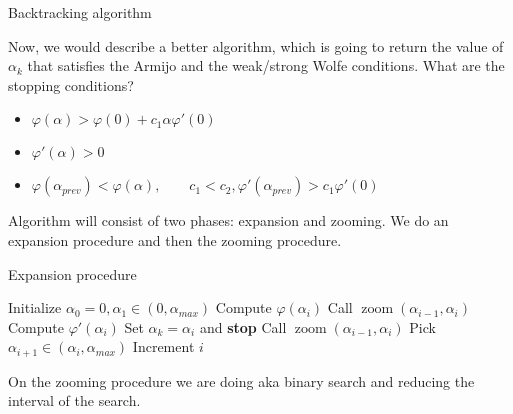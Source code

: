 \begin{algorithm}
  \caption{Backtracking algorithm}
  \begin{algorithmic}[1]
      \State{$\alpha \gets \beta \alpha$}
  \EndWhile{}
\end{algorithmic}
\end{algorithm}

Now, we would describe a better algorithm, which is going to return the value of $\alpha_k$ that satisfies the Armijo and the weak/strong Wolfe conditions. What are the stopping conditions? 

\begin{itemize}
  \item $\varphi(\alpha) > \varphi(0) + c_1 \alpha \varphi'(0)$ 
  \item $\varphi'(\alpha) > 0$
  \item $\varphi(\alpha_{prev}) < \varphi(\alpha), \qquad c_1 < c_2, \varphi'(\alpha_{prev}) > c_1 \varphi'(0)$
\end{itemize}

Algorithm will consist of two phases: expansion and zooming. We do an expansion procedure and then the zooming procedure.

\begin{algorithm}[H]
  \caption{Expansion procedure}
  \begin{algorithmic}[1]
  \State Initialize $\alpha_0 = 0, \alpha_1 \in (0, \alpha_{max})$
      \State Compute $\varphi(\alpha_i)$
          \State Call $\operatorname{zoom}(\alpha_{i-1}, \alpha_i)$
      \EndIf
      \State Compute $\varphi'(\alpha_i)$
          \State Set $\alpha_k = \alpha_i$ and \textbf{stop}
      \EndIf
          \State Call $\operatorname{zoom}(\alpha_{i-1}, \alpha_i)$
      \EndIf
      \State Pick $\alpha_{i+1} \in (\alpha_i, \alpha_{max})$
      \State Increment $i$
  \EndWhile
\end{algorithmic}
\end{algorithm}

On the zooming procedure we are doing aka binary search and reducing the interval of the search.

